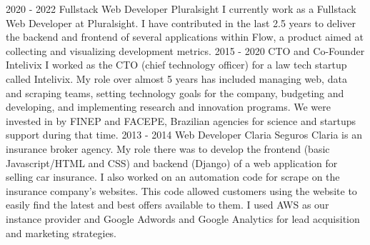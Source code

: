 
\cvevent
    {2020 - 2022}
    {Fullstack Web Developer}
    {Pluralsight}
    {I currently work as a Fullstack Web Developer at Pluralsight. I have contributed in the last 2.5 years to deliver the backend and frontend of several applications within Flow, a product aimed at collecting and visualizing development metrics.}
    {}
    {}
    {}
\cvevent
    {2015 - 2020}
    {CTO and Co-Founder}
    {Intelivix}
    {I worked as the CTO (chief technology officer) for a law tech startup called Intelivix. My role over almost 5 years has included managing web, data and scraping teams, setting technology goals for the company, budgeting and developing, and implementing research and innovation programs. We were invested in by FINEP and FACEPE, Brazilian agencies for science and startups support during that time.}
    {}
    {}
    {}
\cvevent
    {2013 - 2014}
    {Web Developer}
    {Claria Seguros}
    {Claria is an insurance broker agency. My role there was to develop the frontend (basic Javascript/HTML and CSS) and backend (Django) of a web application for selling car insurance. I also worked on an automation code for scrape on the insurance company’s websites. This code allowed customers using the website to easily find the latest and best offers available to them. I used AWS as our instance provider and Google Adwords and Google Analytics for lead acquisition and marketing strategies.}
    {}
    {}
